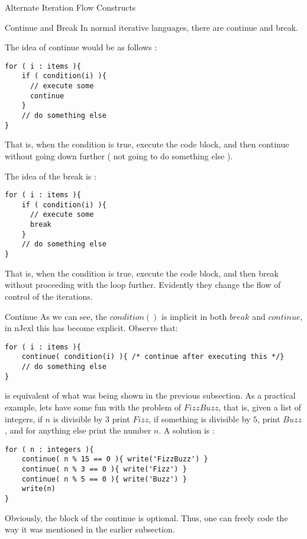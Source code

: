 \begin{section}{Alternate Iteration Flow Constructs}

\begin{subsection}{Continue and Break}
In normal iterative languages, there are continue and break.

The idea of continue would be as follows :
\begin{lstlisting}[style=JexlStyle]
for ( i : items ){
    if ( condition(i) ){
      // execute some 
      continue 
    }
    // do something else 
}
\end{lstlisting}
That is, when the condition is true, execute the code block, 
and then continue without going down further ( not going to do something else ). 

The idea of the break is :
\begin{lstlisting}[style=JexlStyle]
for ( i : items ){
    if ( condition(i) ){
      // execute some 
      break 
    }
    // do something else 
}
\end{lstlisting}
That is, when the condition is true, execute the code block, 
and then break without proceeding with the loop further. 
Evidently they change the flow of control of the iterations.
\end{subsection}

\begin{subsection}{Continue}
As we can see, the $condition()$ is implicit in both $break$ and $continue$,
in nJexl this has become explicit. Observe that:  

\begin{lstlisting}[style=JexlStyle]
for ( i : items ){
    continue( condition(i) ){ /* continue after executing this */} 
    // do something else 
}
\end{lstlisting}
is equivalent of what was being shown in the previous subsection.
As a practical example, lets have some fun with the problem of $FizzBuzz$,
that is, given a list of integers, if $n$ is divisible by $3$ print $Fizz$,
if something is divisible by $5$, print $Buzz$, and for anything else print the number $n$. 
A solution is :

\begin{lstlisting}[style=JexlStyle]
for ( n : integers ){
    continue( n % 15 == 0 ){ write('FizzBuzz') }
    continue( n % 3 == 0 ){ write('Fizz') }
    continue( n % 5 == 0 ){ write('Buzz') }
    write(n) 
}
\end{lstlisting}
Obviously, the block of the continue is optional.
Thus, one can freely code the way it was mentioned in the 
earlier subsection.
\end{subsection}



\end{section}
